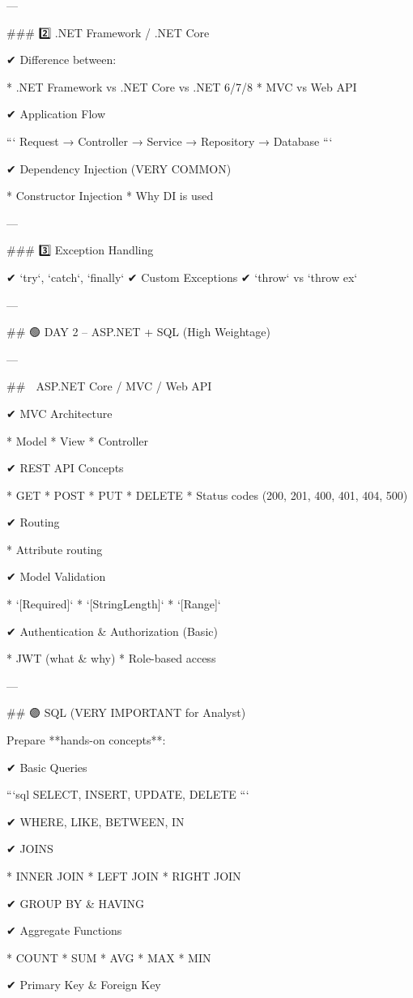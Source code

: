 ---

### 2️⃣ .NET Framework / .NET Core

✔ Difference between:

* .NET Framework vs .NET Core vs .NET 6/7/8
* MVC vs Web API

✔ Application Flow

```
Request → Controller → Service → Repository → Database
```

✔ Dependency Injection (VERY COMMON)

* Constructor Injection
* Why DI is used

---

### 3️⃣ Exception Handling

✔ `try`, `catch`, `finally`
✔ Custom Exceptions
✔ `throw` vs `throw ex`

---

## 🟢 DAY 2 – ASP.NET + SQL (High Weightage)

---

## 🔵 ASP.NET Core / MVC / Web API

✔ MVC Architecture

* Model
* View
* Controller

✔ REST API Concepts

* GET
* POST
* PUT
* DELETE
* Status codes (200, 201, 400, 401, 404, 500)

✔ Routing

* Attribute routing

✔ Model Validation

* `[Required]`
* `[StringLength]`
* `[Range]`

✔ Authentication & Authorization (Basic)

* JWT (what & why)
* Role-based access

---

## 🟣 SQL (VERY IMPORTANT for Analyst)

Prepare **hands-on concepts**:

✔ Basic Queries

```sql
SELECT, INSERT, UPDATE, DELETE
```

✔ WHERE, LIKE, BETWEEN, IN

✔ JOINS

* INNER JOIN
* LEFT JOIN
* RIGHT JOIN

✔ GROUP BY & HAVING

✔ Aggregate Functions

* COUNT
* SUM
* AVG
* MAX
* MIN

✔ Primary Key & Foreign Key

